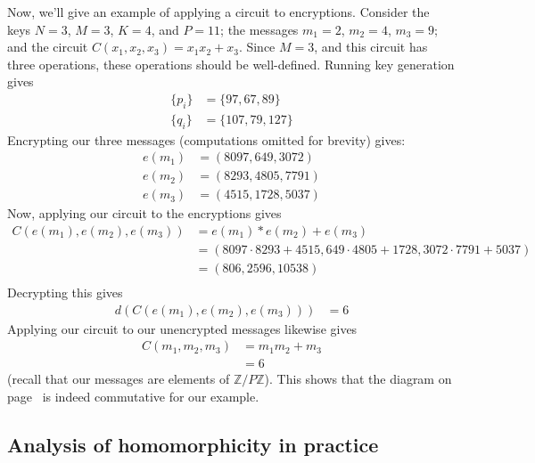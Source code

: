 \documentclass[11pt]{report}
\newcommand{\ZP}{\mathbb{Z}/P\mathbb{Z}}
\begin{document}
Now, we'll give an example of applying a circuit to encryptions. Consider the keys $N=3$, $M=3$, $K=4$, and $P=11$; the messages $m_1=2$, $m_2=4$, $m_3=9$; and the circuit $C(x_1,x_2,x_3) = x_1x_2+x_3$. Since $M=3$, and this circuit has three operations, these operations should be well-defined. Running key generation gives
\begin{align*}
\{p_i\} &= \{97,67,89\}\\
\{q_i\} &= \{107,79,127\}
\end{align*}
Encrypting our three messages (computations omitted for brevity) gives:
\begin{align*}
e(m_1) &= (8097,649,3072)\\
e(m_2) &= (8293,4805,7791)\\
e(m_3) &= (4515,1728,5037) 
\end{align*}
Now, applying our circuit to the encryptions gives
\begin{align*}
C(e(m_1),e(m_2),e(m_3)) &= e(m_1)*e(m_2)+e(m_3)\\
&= (8097\cdot 8293+4515, 649\cdot 4805+1728, 3072\cdot 7791+5037)\\
&= (806,2596,10538)\\
\end{align*}
Decrypting this gives
\begin{align*}
d(C(e(m_1),e(m_2),e(m_3))) &= 6
\end{align*}
Applying our circuit to our unencrypted messages likewise gives
\begin{align*}
C(m_1,m_2,m_3) &= m_1m_2+m_3\\
&= 6
\end{align*}
(recall that our messages are elements of $\ZP$). This shows that the diagram on page~\pageref{hom_diagram} is indeed commutative for our example. 



\subsection{Analysis of homomorphicity in practice}
\label{sec:choice_hom_analysis}
\end{document}
